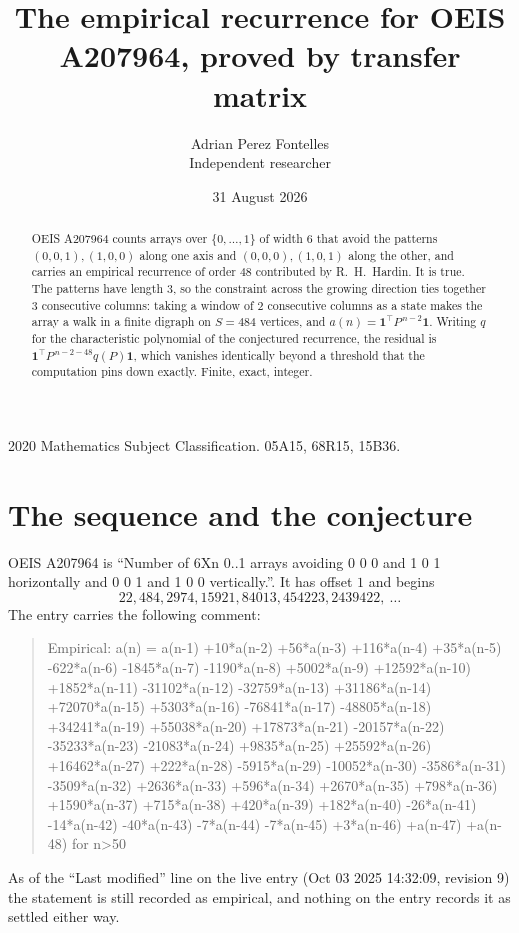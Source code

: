 \documentclass[11pt,a4paper]{article}
\title{The empirical recurrence for OEIS A207964, proved by transfer matrix}
\author{Adrian Perez Fontelles\\ \small Independent researcher}
\date{31 August 2026}
\theoremstyle{plain}
\theoremstyle{definition}
\begin{document}
\maketitle

\begin{abstract}
OEIS A207964 counts arrays over $\{0,\dots,1\}$ of width $6$ that avoid the patterns
$(0,0,1), (1,0,0)$ along one axis and $(0,0,0), (1,0,1)$ along the other, and carries an empirical recurrence of
order $48$ contributed by R.~H.~Hardin. It is true. The patterns have length $3$, so
the constraint across the growing direction ties together $3$ consecutive columns: taking a
window of $2$ consecutive columns as a state makes the array a walk in a finite digraph
on $S=484$ vertices, and $a(n)=\mathbf{1}^{\!\top}P^{\,n-2}\mathbf{1}$. Writing $q$
for the characteristic polynomial of the conjectured recurrence, the residual is
$\mathbf{1}^{\!\top}P^{\,n-2-48}q(P)\mathbf{1}$, which vanishes identically
beyond a threshold that the computation pins down exactly. Finite, exact, integer.
\end{abstract}

\noindent\small 2020 Mathematics Subject Classification. 05A15, 68R15, 15B36.\normalsize

\section{The sequence and the conjecture}

OEIS A207964 is ``Number of 6Xn 0..1 arrays avoiding 0 0 0 and 1 0 1 horizontally and 0 0 1 and 1 0 0 vertically.''. It has offset
$1$ and begins
\[
22, 484, 2974, 15921, 84013, 454223, 2439422,\ \dots
\]
The entry carries the following comment:
\begin{quote}\small
Empirical: a(n) = a(n-1) +10*a(n-2) +56*a(n-3) +116*a(n-4) +35*a(n-5) -622*a(n-6) -1845*a(n-7) -1190*a(n-8) +5002*a(n-9) +12592*a(n-10) +1852*a(n-11) -31102*a(n-12) -32759*a(n-13) +31186*a(n-14) +72070*a(n-15) +5303*a(n-16) -76841*a(n-17) -48805*a(n-18) +34241*a(n-19) +55038*a(n-20) +17873*a(n-21) -20157*a(n-22) -35233*a(n-23) -21083*a(n-24) +9835*a(n-25) +25592*a(n-26) +16462*a(n-27) +222*a(n-28) -5915*a(n-29) -10052*a(n-30) -3586*a(n-31) -3509*a(n-32) +2636*a(n-33) +596*a(n-34) +2670*a(n-35) +798*a(n-36) +1590*a(n-37) +715*a(n-38) +420*a(n-39) +182*a(n-40) -26*a(n-41) -14*a(n-42) -40*a(n-43) -7*a(n-44) -7*a(n-45) +3*a(n-46) +a(n-47) +a(n-48) for n>50
\end{quote}
As of the ``Last modified'' line on the live entry (Oct 03 2025 14:32:09, revision
9) the statement is still recorded as empirical, and nothing on the entry
records it as settled either way.
\end{document}
